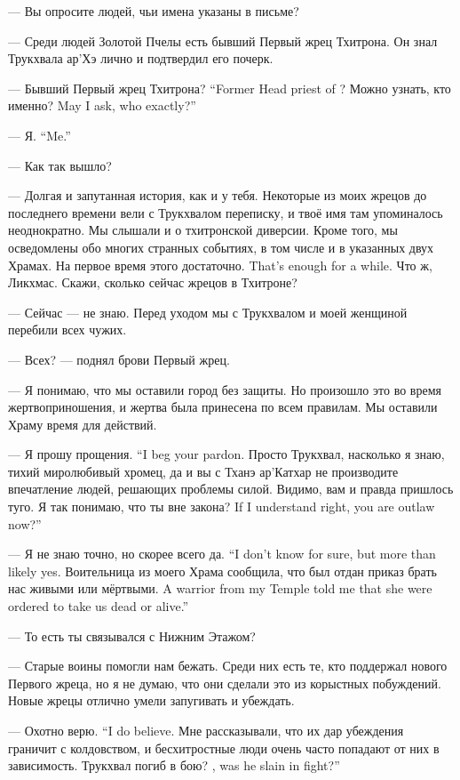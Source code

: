 --- Вы опросите людей, чьи имена указаны в письме?

--- Среди людей Золотой Пчелы есть бывший Первый жрец Тхитрона.
Он знал Трукхвала ар'Хэ лично и подтвердил его почерк.

{--- Бывший Первый жрец Тхитрона?}
{``Former Head priest of \Tchitron?}
{Можно узнать, кто именно?}
{May I ask, who exactly?''}

{--- Я.}
{``Me.''}

--- Как так вышло?

--- Долгая и запутанная история, как и у тебя.
Некоторые из моих жрецов до последнего времени вели с Трукхвалом переписку, и твоё имя там упоминалось неоднократно.
Мы слышали и о тхитронской диверсии.
Кроме того, мы осведомлены обо многих странных событиях, в том числе и в указанных двух Храмах.
{На первое время этого достаточно.}
{That's enough for a while.}
Что ж, Ликхмас.
Скажи, сколько сейчас жрецов в Тхитроне?

--- Сейчас --- не знаю.
Перед уходом мы с Трукхвалом и моей женщиной перебили всех чужих.

--- Всех? --- поднял брови Первый жрец.

--- Я понимаю, что мы оставили город без защиты.
Но произошло это во время жертвоприношения, и жертва была принесена по всем правилам.
Мы оставили Храму время для действий.

{--- Я прошу прощения.}
{``I beg your pardon.}
Просто Трукхвал, насколько я знаю, тихий миролюбивый хромец, да и вы с Тханэ ар'Катхар не производите впечатление людей, решающих проблемы силой.
Видимо, вам и правда пришлось туго.
{Я так понимаю, что ты вне закона?}
{If I understand right, you are outlaw now?''}

{--- Я не знаю точно, но скорее всего да.}
{``I don't know for sure, but more than likely yes.}
{Воительница из моего Храма сообщила, что был отдан приказ брать нас живыми или мёртвыми.}
{A warrior from my Temple told me that she were ordered to take us dead or alive.''}

--- То есть ты связывался с Нижним Этажом?

--- Старые воины помогли нам бежать.
Среди них есть те, кто поддержал нового Первого жреца, но я не думаю, что они сделали это из корыстных побуждений.
Новые жрецы отлично умели запугивать и убеждать.

{--- Охотно верю.}
{``I do believe.}
Мне рассказывали, что их дар убеждения граничит с колдовством, и бесхитростные люди очень часто попадают от них в зависимость.
{Трукхвал погиб в бою?}
{\Trukchual, was he slain in fight?''}

